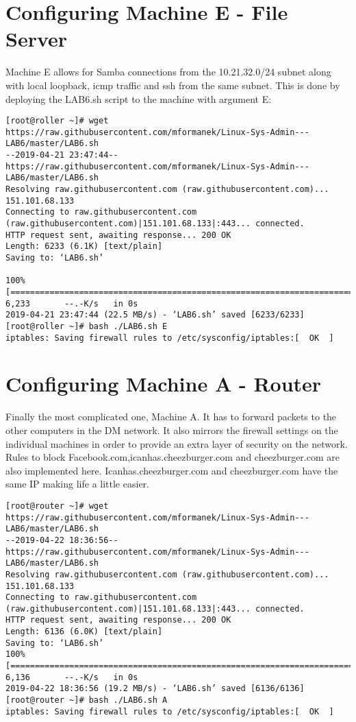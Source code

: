 \documentclass[11pt,onside]{article}
\begin{document}
\section{Configuring Machine E - File Server}
Machine E allows for Samba connections from the 10.21.32.0/24 subnet along with local loopback, icmp traffic and ssh from the same subnet. This is done by deploying the LAB6.sh script to the machine with argument E:
\begin{lstlisting}
[root@roller ~]# wget https://raw.githubusercontent.com/mformanek/Linux-Sys-Admin---LAB6/master/LAB6.sh
--2019-04-21 23:47:44--  https://raw.githubusercontent.com/mformanek/Linux-Sys-Admin---LAB6/master/LAB6.sh
Resolving raw.githubusercontent.com (raw.githubusercontent.com)... 151.101.68.133
Connecting to raw.githubusercontent.com (raw.githubusercontent.com)|151.101.68.133|:443... connected.
HTTP request sent, awaiting response... 200 OK
Length: 6233 (6.1K) [text/plain]
Saving to: ‘LAB6.sh’

100%[==========================================================================>] 6,233       --.-K/s   in 0s
2019-04-21 23:47:44 (22.5 MB/s) - ‘LAB6.sh’ saved [6233/6233]
[root@roller ~]# bash ./LAB6.sh E
iptables: Saving firewall rules to /etc/sysconfig/iptables:[  OK  ]
\end{lstlisting}
\section{Configuring Machine A - Router}
Finally the most complicated one, Machine A. It has to forward packets to the other computers in the DM network. It also mirrors the firewall settings on the individual machines in order to provide an extra layer of security on the network. Rules to block Facebook.com,icanhas.cheezburger.com and cheezburger.com are also implemented here.  Icanhas.cheezburger.com and cheezburger.com have the same IP making life a little easier.
\begin{lstlisting}
[root@router ~]# wget https://raw.githubusercontent.com/mformanek/Linux-Sys-Admin---LAB6/master/LAB6.sh
--2019-04-22 18:36:56--  https://raw.githubusercontent.com/mformanek/Linux-Sys-Admin---LAB6/master/LAB6.sh
Resolving raw.githubusercontent.com (raw.githubusercontent.com)... 151.101.68.133
Connecting to raw.githubusercontent.com (raw.githubusercontent.com)|151.101.68.133|:443... connected.
HTTP request sent, awaiting response... 200 OK
Length: 6136 (6.0K) [text/plain]
Saving to: ‘LAB6.sh’
100%[=============================================================================================================>] 6,136       --.-K/s   in 0s
2019-04-22 18:36:56 (19.2 MB/s) - ‘LAB6.sh’ saved [6136/6136]
[root@router ~]# bash ./LAB6.sh A
iptables: Saving firewall rules to /etc/sysconfig/iptables:[  OK  ]
\end{lstlisting}
\end{document}
